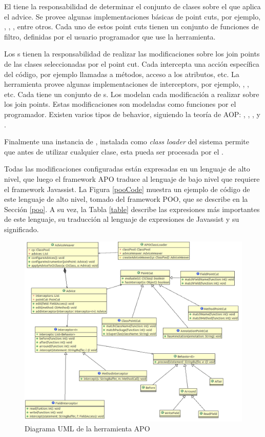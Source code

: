 El  tiene la responsabilidad de determinar el conjunto de
clases sobre el que aplica el advice. Se provee algunas implementaciones básicas
de point cuts, por ejemplo, , , 
, entre otros. Cada uno de estos point cuts tienen un conjunto de funciones
de filtro, definidas por el usuario programador que use la herramienta. 

Los s tienen la responsabilidad de realizar las modificaciones sobre 
los join points de las clases seleccionadas por el point cut. 
Cada  intercepta una acción específica del código, por ejemplo
llamadas a métodos, acceso a los atributos, etc. La herramienta provee algunas implementaciones de interceptors,
por ejemplo, , , etc. 
Cada  tiene un conjunto de s.
Los  modelan cada modificación a realizar sobre los join points. 
Estas modificaciones son modeladas como funciones por el programador.
Existen varios tipos de behavior, siguiendo la teoría de AOP: 
, , ,  y . 
 
Finalmente una instancia de , instalada como \emph{class
loader} del sistema permite que antes de utilizar cualquier clase, esta pueda
ser procesada por el .

Todas las modificaciones configuradas están expresadas en un
lenguaje de alto nivel, que luego el framework APO traduce al lenguaje de bajo nivel que requiere el
framework Javassist.
La Figura \ref{pooCode} muestra un ejemplo de código de este lenguaje de alto nivel,
tomado del framework POO, que se describe en la Sección \ref{poo}.
A su vez, la Tabla \ref{table} describe las expresiones más importantes de este lenguaje, 
su traducción al lenguaje de expresiones de Javassist y su significado.

\begin{figure}[h]
	\centering
	\includegraphics[scale=0.4]{img/apo}
	\caption{Diagrama UML de la herramienta APO}
	\label{aopImage}
\end{figure}	 


